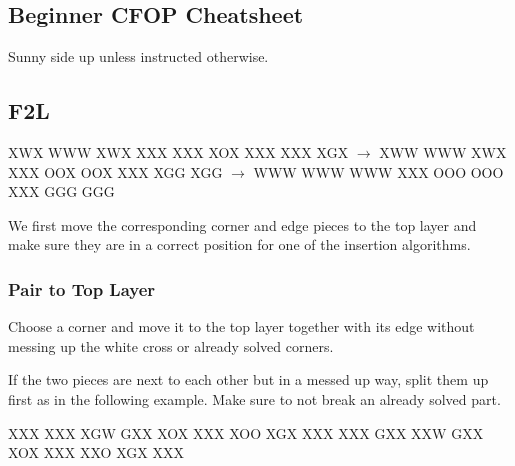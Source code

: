 \documentclass[9pt,dvipsnames]{extarticle}
\begin{document}



\begin{multicols*}{4}
\section*{Beginner CFOP Cheatsheet}
Sunny side up unless instructed otherwise.
\subsection*{F2L}

\noindent%
\RubikFaceDown
{X}{W}{X}
{W}{W}{W}
{X}{W}{X}%
\RubikFaceRight
{X}{X}{X}
{X}{X}{X}
{X}{O}{X}%
\RubikFaceFront
{X}{X}{X}
{X}{X}{X}
{X}{G}{X}%
\ShowCube{\cubesize}{\cubescale}{\DrawRubikCubeRD}%
$\rightarrow$%
\noindent%
\RubikFaceDown
{X}{W}{W}
{W}{W}{W}
{X}{W}{X}%
\RubikFaceRight
{X}{X}{X}
{O}{O}{X}
{O}{O}{X}%
\RubikFaceFront
{X}{X}{X}
{X}{G}{G}
{X}{G}{G}%
\ShowCube{\cubesize}{\cubescale}{\DrawRubikCubeRD}%
$\rightarrow$%
\RubikFaceDown
{W}{W}{W}
{W}{W}{W}
{W}{W}{W}%
\RubikFaceRight
{X}{X}{X}
{O}{O}{O}
{O}{O}{O}%
\RubikFaceFront
{X}{X}{X}
{G}{G}{G}
{G}{G}{G}%
\ShowCube{\cubesize}{\cubescale}{\DrawRubikCubeRD}

We first move the corresponding corner and edge pieces to the top layer and make
sure they are in a correct position for one of the insertion algorithms.

\subsubsection*{Pair to Top Layer}

Choose a corner and move it to the top layer together with its edge without
messing up the white cross or already solved corners.

If the two pieces are next to each other but in a messed up way, split them up
first as in the following example. Make sure to not break an already solved
part.

\RubikFaceUp
{X}{X}{X}
{X}{X}{X}
{X}{G}{W}%
\RubikFaceRight
{G}{X}{X}
{X}{O}{X}
{X}{X}{X}%
\RubikFaceFront
{X}{O}{O}
{X}{G}{X}
{X}{X}{X}%
\ShowCube{\cubesize}{\cubescale}{\DrawRubikCubeRU}%
\RubikRotation{\fourspot}%
%
\RubikFaceUp
{X}{X}{X}
{G}{X}{X}
{X}{X}{W}%
\RubikFaceRight
{G}{X}{X}
{X}{O}{X}
{X}{X}{X}%
\RubikFaceFront
{X}{X}{O}
{X}{G}{X}
{X}{X}{X}%
\ShowCube{\cubesize}{\cubescale}{\DrawRubikCubeRU}%


\end{multicols*}
\end{document}
